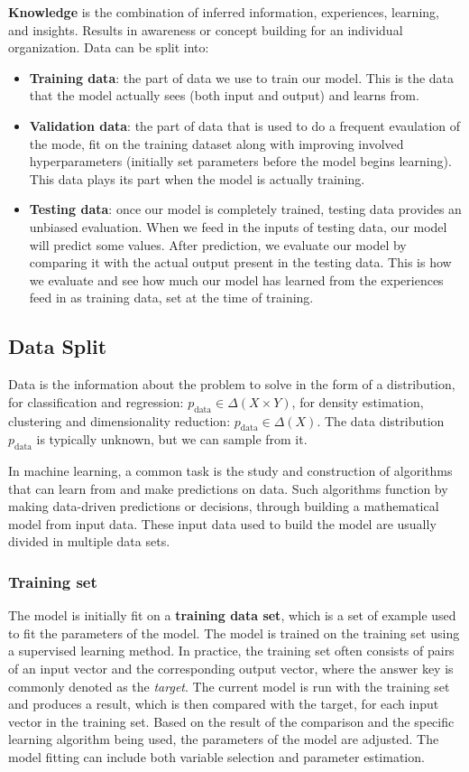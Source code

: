 \textbf{Knowledge} is the combination of inferred information, experiences, learning, and insights. Results in awareness or concept building for an individual organization. Data can be split into:
\begin{itemize}
    \item \textbf{Training data}: the part of data we use to train our model. This is the data that the model actually sees (both input and output) and learns from.
    \item \textbf{Validation data}: the part of data that is used to do a frequent evaulation of the mode, fit on the training dataset along with improving involved hyperparameters (initially set parameters before the model begins learning). This data plays its part when the model is actually training.
    \item \textbf{Testing data}: once our model is completely trained, testing data provides an unbiased evaluation. When we feed in the inputs of testing data, our model will predict some values. After prediction, we evaluate our model by comparing it with the actual output present in the testing data. This is how we evaluate and see how much our model has learned from the experiences feed in as training data, set at the time of training. 
\end{itemize}

\subsection{Data Split}
Data is the information about the problem to solve in the form of a distribution, for classification and regression: \(p_{\text{data}} \in \Delta (X \times Y)\), for density estimation, clustering and dimensionality reduction: \(p_{\text{data}} \in \Delta (X)\). The data distribution \(p_{\text{data}}\) is typically unknown, but we can sample from it.

In machine learning, a common task is the study and construction of algorithms that can learn from and make predictions on data. Such algorithms function by making data-driven predictions or decisions, through building a mathematical model from input data. These input data used to build the model are usually divided in multiple data sets.

\subsubsection{Training set}
The model is initially fit on a \textbf{training data set}, which is a set of example used to fit the parameters of the model. The model is trained on the training set using a supervised learning method. In practice, the training set often consists of pairs of an input vector and the corresponding output vector, where the answer key is commonly denoted as the \emph{target}. The current model is run with the training set and produces a result, which is then compared with the target, for each input vector in the training set. Based on the result of the comparison and the specific learning algorithm being used, the parameters of the model are adjusted. The model fitting can include both variable selection and parameter estimation.

